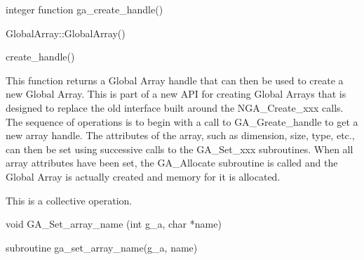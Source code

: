 \documentclass[12pt]{article}
\begin{document}
\begin{fapi}
\begin{fcode}
integer function ga_create_handle()
\end{fcode}
\end{fapi}

\begin{cxxapi}
\begin{cxxcode}
GlobalArray::GlobalArray()
\end{cxxcode}
\end{cxxapi}

\begin{pyapi}
\begin{pycode}
create_handle()
\end{pycode}
\end{pyapi}

\begin{desc}

  This function returns a Global Array handle that can then be used to
  create a new Global Array. This is part of a new API for creating
  Global Arrays that is designed to replace the old interface built
  around the NGA_Create_xxx calls. The sequence of operations is to
  begin with a call to GA_Greate_handle to get a new array handle. The
  attributes of the array, such as dimension, size, type, etc., can
  then be set using successive calls to the GA_Set_xxx subroutines.
  When all array attributes have been set, the GA_Allocate subroutine
  is called and the Global Array is actually created and memory for it
  is allocated.

  This is a collective operation.

\end{desc}



\begin{capi}
\begin{ccode}
void GA_Set_array_name (int g_a, char *name)
\end{ccode}
\begin{funcargs}
\end{funcargs}
\end{capi}

\begin{fapi}
\begin{fcode}
subroutine ga_set_array_name(g_a, name)
\end{fcode}
\begin{funcargs}
\end{funcargs}
\end{fapi}
\end{document}
